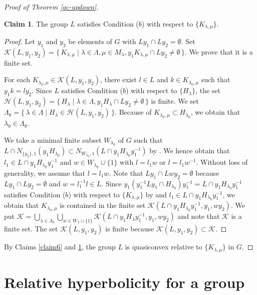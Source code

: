 \documentclass{amsart}
\theoremstyle{definition}
\newtheorem{Claim}[Thm]{Claim}
\begin{document}
\begin{proof}[Proof of Theorem \ref{qc-updown}]
\begin{Claim}\label{claim7}
The group $L$ satisfies Condition ($b$) with respect to $\{K_{\lambda,\mu}\}$. 
\end{Claim}

\begin{proof}
Let $y_1$ and $y_2$ be elements of $G$ with $Ly_1\cap Ly_2=\emptyset$. 
Set ${\mathscr{K}}(L,y_1,y_2)=\{\, K_{\lambda,\mu} \mid \lambda \in \Lambda, \mu \in M_{\lambda}, y_1K_{\lambda,\mu}\cap Ly_2\ne\emptyset \,\}$. 
We prove that it is a finite set. 

For each $K_{\lambda_0,\mu}\in {\mathscr{K}}(L,y_1,y_2)$, there exist $l\in L$ and $k\in K_{\lambda_0,\mu}$ such that $y_1k=ly_2$. 
Since $L$ satisfies Condition ($b$) with respect to $\{H_\lambda\}$, the set ${\mathscr{H}}(L,y_1,y_2)=\{\,H_{\lambda} \mid \lambda\in \Lambda, y_1H_{\lambda}\cap Ly_2\ne \emptyset\,\}$ is finite. 
We set $\Lambda_8=\{\,\lambda\in \Lambda \mid H_{\lambda}\in{\mathscr{H}}(L,y_1,y_2)\,\}$. 
Because of $K_{\lambda_0,\mu}\subset H_{\lambda_0}$, we obtain that $\lambda_0\in\Lambda_8$. 

We take a minimal finite subset $W_{\lambda_0}$ of $G$ such that $L\cap N_{\{y_2\},1}(y_1H_{\lambda_0})\subset N_{W_{\lambda_0},1}(L\cap y_1H_{\lambda_0}y_1^{-1})$ by \cite[Lemma 4.22]{M-O-Y1}. 
We hence obtain that $l_1\in L\cap y_1H_{\lambda_0}y_1^{-1}$ and $w\in W_{\lambda_0}\cup \{1\}$ with $l=l_1w$ or $l=l_1 w^{-1}$. 
Without loss of generality, we assume that $l=l_1 w$. 
Note that $Ly_1\cap Lwy_2=\emptyset$ because $Ly_1\cap Ly_2=\emptyset$ and $w=l_1^{-1}l\in L$. 
Since $y_1(y_1^{-1}Ly_1\cap H_{\lambda_0})y_1^{-1}=L\cap y_1H_{\lambda_0}y_1^{-1}$ satisfies Condition ($b$) with respect to $\{K_{\lambda,\mu}\}$ by \cite[Lemma 4.16 and Theorem 1.4 (i)]{M-O-Y1} and $l_1\in L\cap y_1H_{\lambda_0}y_1^{-1}$, we obtain that $K_{\lambda_0,\mu}$ is contained in the finite set ${\mathscr{K}}(L\cap y_1H_{\lambda_0}y_1^{-1},y_1,wy_2)$. 
We put ${\mathscr{K}}=\bigcup_{\lambda\in\Lambda_8}\bigcup_{w\in W_{\lambda}\cup \{1\}}{\mathscr{K}}(L\cap y_1H_{\lambda}y_1^{-1},y_1,wy_2)$ and note that ${\mathscr{K}}$ is a finite set. 
The set ${\mathscr{K}}(L,y_1,y_2)$ is finite because ${\mathscr{K}}(L,y_1,y_2)\subset {\mathscr{K}}$. 
\end{proof}

By Claims \ref{claim6} and \ref{claim7}, the group $L$ is quasiconvex relative to $\{K_{\lambda,\mu}\}$ in $G$. 
\end{proof}

\section{Relative hyperbolicity for a group}\label{app}
\end{document}

